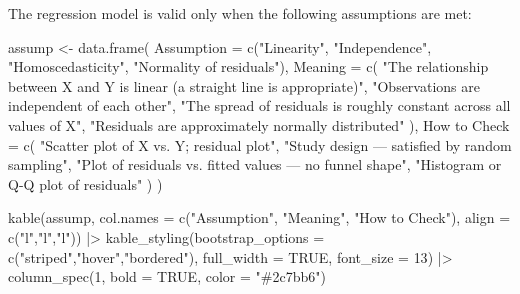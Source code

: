 \documentclass[
  12pt,
  letterpaper,
]{book}
\newenvironment{Shaded}{\begin{snugshade}}{\end{snugshade}}
\newcommand{\AttributeTok}[1]{\textcolor[rgb]{0.40,0.45,0.13}{#1}}
\newcommand{\ConstantTok}[1]{\textcolor[rgb]{0.56,0.35,0.01}{#1}}
\newcommand{\DecValTok}[1]{\textcolor[rgb]{0.68,0.00,0.00}{#1}}
\newcommand{\FunctionTok}[1]{\textcolor[rgb]{0.28,0.35,0.67}{#1}}
\newcommand{\NormalTok}[1]{\textcolor[rgb]{0.00,0.23,0.31}{#1}}
\newcommand{\OtherTok}[1]{\textcolor[rgb]{0.00,0.23,0.31}{#1}}
\newcommand{\SpecialCharTok}[1]{\textcolor[rgb]{0.37,0.37,0.37}{#1}}
\newcommand{\StringTok}[1]{\textcolor[rgb]{0.13,0.47,0.30}{#1}}
\begin{document}
The regression model is valid only when the following assumptions are
met:

\begin{Shaded}
\begin{Highlighting}[]
\NormalTok{assump }\OtherTok{\textless{}{-}} \FunctionTok{data.frame}\NormalTok{(}
  \AttributeTok{Assumption =} \FunctionTok{c}\NormalTok{(}\StringTok{"Linearity"}\NormalTok{,}
                 \StringTok{"Independence"}\NormalTok{,}
                 \StringTok{"Homoscedasticity"}\NormalTok{,}
                 \StringTok{"Normality of residuals"}\NormalTok{),}
  \AttributeTok{Meaning =} \FunctionTok{c}\NormalTok{(}
    \StringTok{"The relationship between X and Y is linear (a straight line is appropriate)"}\NormalTok{,}
    \StringTok{"Observations are independent of each other"}\NormalTok{,}
    \StringTok{"The spread of residuals is roughly constant across all values of X"}\NormalTok{,}
    \StringTok{"Residuals are approximately normally distributed"}
\NormalTok{  ),}
  \StringTok{\textasciigrave{}}\AttributeTok{How to Check}\StringTok{\textasciigrave{}} \OtherTok{=} \FunctionTok{c}\NormalTok{(}
    \StringTok{"Scatter plot of X vs. Y; residual plot"}\NormalTok{,}
    \StringTok{"Study design — satisfied by random sampling"}\NormalTok{,}
    \StringTok{"Plot of residuals vs. fitted values — no funnel shape"}\NormalTok{,}
    \StringTok{"Histogram or Q{-}Q plot of residuals"}
\NormalTok{  )}
\NormalTok{)}

\FunctionTok{kable}\NormalTok{(assump, }\AttributeTok{col.names =} \FunctionTok{c}\NormalTok{(}\StringTok{"Assumption"}\NormalTok{, }\StringTok{"Meaning"}\NormalTok{, }\StringTok{"How to Check"}\NormalTok{),}
      \AttributeTok{align =} \FunctionTok{c}\NormalTok{(}\StringTok{"l"}\NormalTok{,}\StringTok{"l"}\NormalTok{,}\StringTok{"l"}\NormalTok{)) }\SpecialCharTok{|\textgreater{}}
  \FunctionTok{kable\_styling}\NormalTok{(}\AttributeTok{bootstrap\_options =} \FunctionTok{c}\NormalTok{(}\StringTok{"striped"}\NormalTok{,}\StringTok{"hover"}\NormalTok{,}\StringTok{"bordered"}\NormalTok{),}
                \AttributeTok{full\_width =} \ConstantTok{TRUE}\NormalTok{, }\AttributeTok{font\_size =} \DecValTok{13}\NormalTok{) }\SpecialCharTok{|\textgreater{}}
  \FunctionTok{column\_spec}\NormalTok{(}\DecValTok{1}\NormalTok{, }\AttributeTok{bold =} \ConstantTok{TRUE}\NormalTok{, }\AttributeTok{color =} \StringTok{"\#2c7bb6"}\NormalTok{)}
\end{Highlighting}
\end{Shaded}
\end{document}
